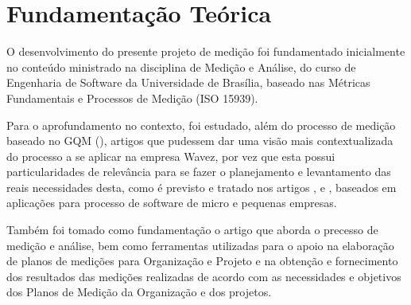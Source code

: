 \chapter{Fundamentação Teórica}

O desenvolvimento do presente projeto de medição foi fundamentado inicialmente no conteúdo ministrado na disciplina de Medição e Análise, do curso de Engenharia de Software da Universidade de Brasília, baseado nas Métricas Fundamentais e Processos de Medição (ISO 15939).

Para o aprofundamento no contexto, foi estudado, além do processo de medição baseado no GQM (\cite {GQM2009}), artigos que pudessem dar uma visão mais contextualizada do processo a se aplicar na empresa Wavez, por vez que esta possui particularidades de relevância para se fazer o planejamento e levantamento das reais necessidades desta, como é previsto e tratado nos artigos \cite {franca1998mediccao}, \cite {anacleto2004metodo} e \cite {salviano2006proposta}, baseados em aplicações para processo de software de micro e pequenas empresas.

Também foi tomado como fundamentação o artigo \cite {schnaider2004abordagem} que aborda o precesso de medição e análise, bem como ferramentas utilizadas para o apoio na elaboração de planos de medições para Organização e Projeto e na obtenção e fornecimento dos resultados das medições realizadas de acordo com as necessidades e objetivos dos Planos de Medição da
Organização e dos projetos.
